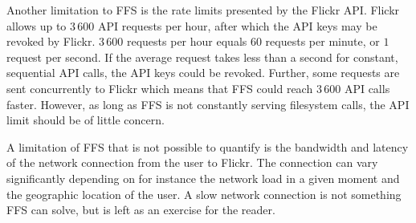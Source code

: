 Another limitation to FFS is the rate limits presented by the Flickr API. Flickr allows up to $3\,600$ API requests per hour, after which the API keys may be revoked by Flickr. $3\,600$ requests per hour equals $60$ requests per minute, or $1$ request per second. If the average request takes less than a second for constant, sequential API calls, the API keys could be revoked. Further, some requests are sent concurrently to Flickr which means that FFS could reach $3\,600$ API calls faster. However, as long as FFS is not constantly serving filesystem calls, the API limit should be of little concern.

A limitation of FFS that is not possible to quantify is the bandwidth and latency of the network connection from the user to Flickr. The connection can vary significantly depending on for instance the network load in a given moment and the geographic location of the user. A slow network connection is not something FFS can solve, but is left as an exercise for the reader.